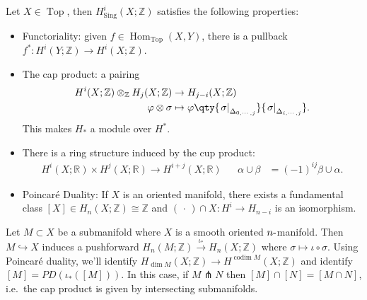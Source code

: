 \begin{theorem}

Let \(X\in {\operatorname{Top}}\), then
\(H_{{\operatorname{Sing}}}^i(X; {\mathbb{Z}})\) satisfies the following
properties:

\begin{itemize}
\item
  Functoriality: given
  \(f\in {\operatorname{Hom}}_{\operatorname{Top}}(X, Y)\), there is a
  pullback \(f^*: H^i(Y; {\mathbb{Z}}) \to H^i(X; {\mathbb{Z}})\).
\item
  The cap product: a pairing
  \begin{align*}
  H^i(X; {\mathbb{Z}}) \otimes_{\mathbb{Z}}H_j(X; {\mathbb{Z}}) &\to H_{j-i}(X; {\mathbb{Z}}) \\
  \varphi\otimes\sigma &\mapsto \varphi\qty{{ \left.{{\sigma}} \right|_{{\Delta_{0, \cdots, j}}} }} { \left.{{ \sigma}} \right|_{{\Delta_{i, \cdots, j}}} }
  .\end{align*}
  This makes \(H_*\) a module over \(H^*\).
\item
  There is a ring structure induced by the cup product:
  \begin{align*}
  H^i(X; {\mathbb{R}}) \times H^j(X; {\mathbb{R}})\to H^{i+j}(X; {\mathbb{R}}) && \alpha\cup \beta &= (-1)^{ij} \beta \cup \alpha
  .\end{align*}
\item
  Poincaré Duality: If \(X\) is an oriented manifold, there exists a
  fundamental class
  \([X] \in H_{n}(X; {\mathbb{Z}}) \cong {\mathbb{Z}}\) and
  \(({\,\cdot\,})\cap X: H^i \to H_{n-i}\) is an isomorphism.
\end{itemize}

\end{theorem}

\begin{remark}

Let \(M \subset X\) be a submanifold where \(X\) is a smooth oriented
\(n{\hbox{-}}\)manifold. Then \(M \hookrightarrow X\) induces a
pushforward
\(H_n(M; {\mathbb{Z}}) \xrightarrow{\iota_*} H_n(X; {\mathbb{Z}})\)
where \(\sigma \mapsto \iota \circ \sigma\). Using Poincaré duality,
we'll identify
\(H_{\dim M}(X; {\mathbb{Z}}) \to H^{\operatorname{codim}M}(X; {\mathbb{Z}})\)
and identify \([M] = PD( \iota_*( [M]))\). In this case, if
\(M\pitchfork N\) then \([M] \cap [N] = [M \cap N]\), i.e.~the cap
product is given by intersecting submanifolds.

\end{remark}

